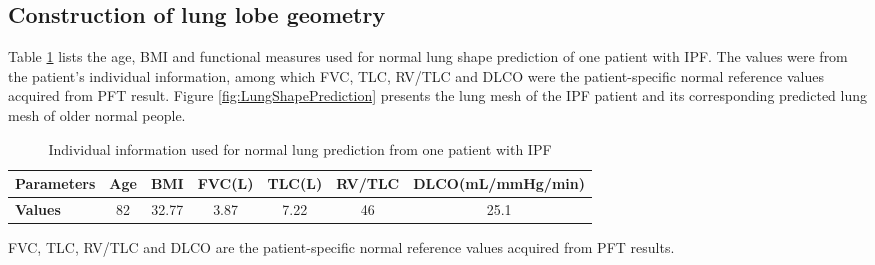 \subsection{Construction of lung lobe geometry}
Table \ref{tab:PatientIndividualData} lists the age, BMI and functional measures used for normal lung shape prediction of one patient with IPF. The values were from the patient's individual information, among which FVC, TLC, RV/TLC and DLCO were the patient-specific normal reference values acquired from PFT result. Figure \ref{fig:LungShapePrediction} presents the lung mesh of the IPF patient and its corresponding predicted lung mesh of older normal people. 

\begin{table}[h]
\centering
\caption{Individual information used for normal lung prediction from one patient with IPF}
\label{tab:PatientIndividualData}
\begin{tabular}{| l | c | c| c | c| c | c|}
\hline
\bf{Parameters} & \bf{Age} & \bf{BMI} & \bf{FVC(L)} & \bf{TLC(L)} & \bf{RV/TLC} & \bf{DLCO(mL/mmHg/min)}\\
\hline 
\bf{Values} & 82 & 32.77 & 3.87 & 7.22 & 46 & 25.1\\
\hline
\end{tabular}
\begin{tablenotes}
  \item[1] FVC, TLC, RV/TLC and DLCO are the patient-specific normal reference values acquired from PFT results.
\end{tablenotes}
\end{table}

